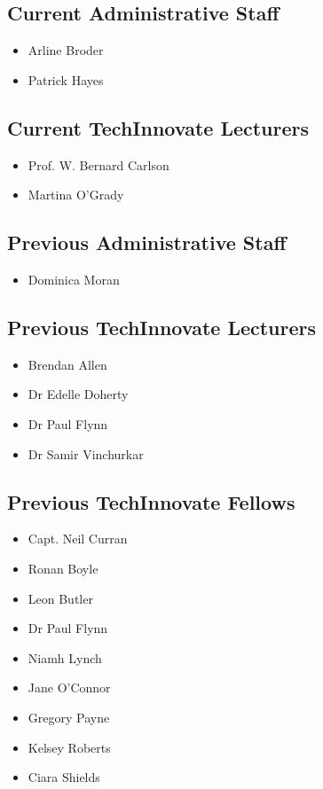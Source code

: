 \documentclass[10pt,a4paper]{res} %
\begin{document}
\begin{resume}
\subsection*{Current Administrative Staff}

\begin{itemize} \itemsep -2pt
\item Arline Broder
\item Patrick Hayes
\end{itemize}

\subsection*{Current TechInnovate Lecturers}

\begin{itemize} \itemsep -2pt
\item Prof. W. Bernard Carlson
\item Martina O'Grady
\end{itemize}

\subsection*{Previous Administrative Staff}

\begin{itemize} \itemsep -2pt
\item Dominica Moran
\end{itemize}

\subsection*{Previous TechInnovate Lecturers}

\begin{itemize} \itemsep -2pt
\item Brendan Allen
\item Dr Edelle Doherty
\item Dr Paul Flynn
\item Dr Samir Vinchurkar
\end{itemize}

\subsection*{Previous TechInnovate Fellows}

\begin{itemize} \itemsep -2pt
\item Capt. Neil Curran
\item Ronan Boyle
\item Leon Butler
\item Dr Paul Flynn
\item Niamh Lynch
\item Jane O'Connor
\item Gregory Payne
\item Kelsey Roberts
\item Ciara Shields
\end{itemize}


\end{resume}
\end{document}
